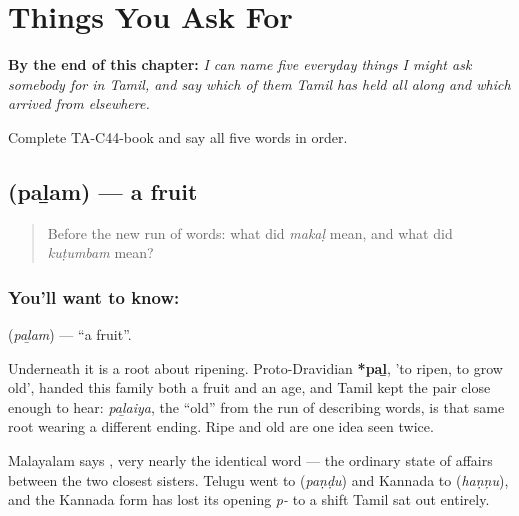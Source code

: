 
\chapter{Things You Ask For}
\label{ch:ta-things-you-ask-for}

\begin{chapteropening}
\textbf{By the end of this chapter:} \emph{I can name five everyday things I might ask somebody for in Tamil, and say which of them Tamil has held all along and which arrived from elsewhere.}

Complete TA-C44-book and say all five words in order.
\end{chapteropening}

\section[\texorpdfstring{\ta{பழம்} (paḻam)}{பழம் (paḻam)}]{ (paḻam) — a fruit}

\label{lesson:TA-C44-fruit}



\begin{quote}
Before the new run of words: what did \emph{makaḷ} mean, and what did \emph{kuṭumbam} mean?
\end{quote}

\subsection*{You'll want to know: }
\textbf{} (\emph{paḻam}) — \textquotedblleft{}a fruit\textquotedblright{}.

Underneath it is a root about ripening. Proto-Dravidian \textbf{*paḻ}, 'to ripen, to grow old', handed this family both a fruit and an age, and Tamil kept the pair close enough to hear: \emph{paḻaiya}, the \textquotedblleft{}old\textquotedblright{} from the run of describing words, is that same root wearing a different ending. Ripe and old are one idea seen twice.

Malayalam says , very nearly the identical word — the ordinary state of affairs between the two closest sisters. Telugu went to  (\emph{paṇḍu}) and Kannada to  (\emph{haṇṇu}), and the Kannada form has lost its opening \emph{p-} to a shift Tamil sat out entirely.

